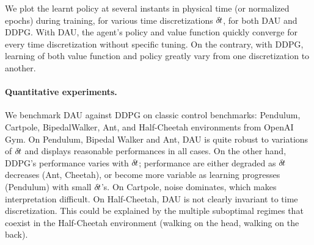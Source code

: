 We plot the learnt policy at several instants in physical time (or
normalized epochs) during training, for various time discretizations
${\delta\hspace{-.1em}t}$, for both DAU and DDPG. With DAU, the agent's policy and value function quickly
converge for every time discretization without specific
tuning. On the contrary, with DDPG, learning of both value function
and policy greatly vary from one discretization to another.

\paragraph{Quantitative experiments.}
We benchmark DAU against DDPG on classic control benchmarks: Pendulum,
Cartpole, BipedalWalker, Ant, and Half-Cheetah environments from OpenAI Gym. On
Pendulum, Bipedal Walker and Ant, DAU is quite robust to variations of
${\delta\hspace{-.1em}t}$ and displays reasonable performances in all cases. On the other hand,
DDPG's performance varies with ${\delta\hspace{-.1em}t}$; performance are either degraded as
${\delta\hspace{-.1em}t}$ decreases (Ant, Cheetah), or become more variable as learning
progresses (Pendulum) with small ${\delta\hspace{-.1em}t}$'s. On Cartpole, noise dominates,
which makes interpretation difficult. On Half-Cheetah, DAU is not clearly
invariant to time discretization. This could be explained by the multiple
suboptimal regimes that coexist in the Half-Cheetah environment (walking on the
head, walking on the back).

% 


